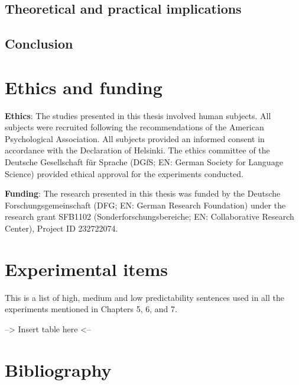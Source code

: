 \documentclass[a4paper, nobind]{templates/ociamthesis}
\begin{document}
\hypertarget{theoretical-and-practical-implications}{%
\section{Theoretical and practical implications}\label{theoretical-and-practical-implications}}

\hypertarget{conclusion-3}{%
\section{Conclusion}\label{conclusion-3}}

\minitoc 

\hypertarget{chapter-ethics}{%
\chapter{Ethics and funding}\label{chapter-ethics}}

\noindent 

\textbf{Ethics}: The studies presented in this thesis involved human subjects.
All subjects were recruited following the recommendations of the American Psychological Association.
All subjects provided an informed consent in accordance with the Declaration of Helsinki.
The ethics committee of the Deutsche Gesellschaft für Sprache (DGfS; EN: German Society for Language Science) provided ethical approval for the experiments conducted.

\textbf{Funding}: The research presented in this thesis was funded by the Deutsche Forschungsgemeinschaft (DFG; EN: German Research Foundation) under the research grant SFB1102 (Sonderforschungsbereiche; EN: Collaborative Research Center), Project ID 232722074.

\startappendices

\hypertarget{experimental-items}{%
\chapter{Experimental items}\label{experimental-items}}

This is a list of high, medium and low predictability sentences used in all the experiments mentioned in Chapters 5, 6, and 7.

--\textgreater{} Insert table here \textless--

\hypertarget{bibliography}{%
\chapter*{Bibliography}\label{bibliography}}
\end{document}
